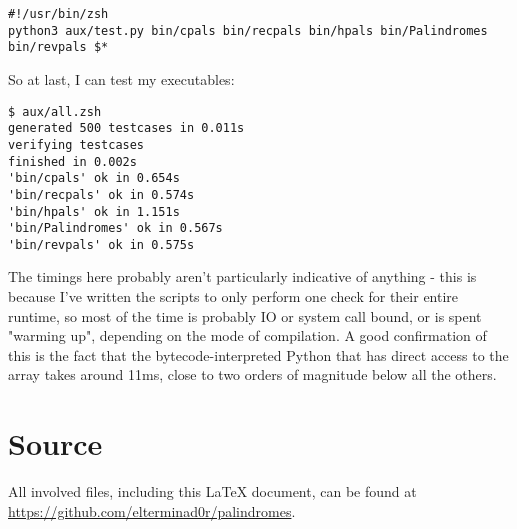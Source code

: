 \documentclass[fleqn,a4paper,11pt]{article}
\begin{document}
\begin{lstlisting}[caption=Test wrapper script]
#!/usr/bin/zsh
python3 aux/test.py bin/cpals bin/recpals bin/hpals bin/Palindromes bin/revpals $*
\end{lstlisting}

\iffalse $ \fi %

    So at last, I can test my executables:

\begin{lstlisting}[caption=Actual testing]
$ aux/all.zsh
generated 500 testcases in 0.011s
verifying testcases
finished in 0.002s
'bin/cpals' ok in 0.654s
'bin/recpals' ok in 0.574s
'bin/hpals' ok in 1.151s
'bin/Palindromes' ok in 0.567s
'bin/revpals' ok in 0.575s
\end{lstlisting}

\iffalse $ \fi %

    The timings here probably aren't particularly indicative of anything - this
    is because I've written the scripts to only perform one check for their
    entire runtime, so most of the time is probably IO or system call bound, or
    is spent "warming up", depending on the mode of compilation. A good
    confirmation of this is the fact that the bytecode-interpreted Python that
    has direct access to the array takes around 11ms, close to two orders of
    magnitude below all the others.

    \section{Source}

    All involved files, including this \LaTeX{} document, can be found at
    \url{https://github.com/elterminad0r/palindromes}.
\end{document}
